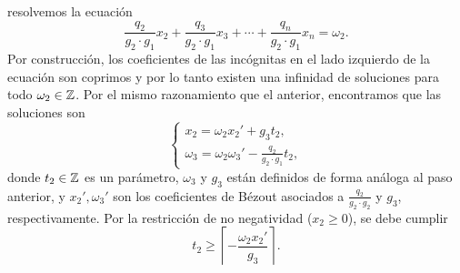 resolvemos la ecuación
\begin{equation*}
	\frac{q_2}{g_2 \cdot g_1}x_2 +
	\frac{q_3}{g_2 \cdot g_1}x_3 +
	\cdots +
	\frac{q_n}{g_2 \cdot g_1}x_n
	= \omega_2.
\end{equation*}
Por construcción, los coeficientes de las incógnitas en el lado izquierdo de la ecuación son
coprimos y por lo tanto existen una infinidad de soluciones para todo $\omega_2 \in \mathbb{Z}$. Por el
mismo razonamiento que el anterior, encontramos que las soluciones son
\begin{equation*}
	\begin{cases}
		x_2 = \omega_2x_2' + g_3t_2, \\
		\omega_3 = \omega_2\omega_3' - \frac{q_2}{g_2 \cdot g_1}t_2,
	\end{cases}
\end{equation*}
donde $t_2 \in \mathbb{Z}$ es un parámetro, $\omega_3$ y $g_3$ están definidos de forma análoga al paso
anterior, y $x_2', \omega_3'$ son los coeficientes de Bézout asociados a $\frac{q_2}{g_2 \cdot g_2}$
y $g_3$, respectivamente. Por la restricción de no negatividad ($x_2 \geq 0$), se debe cumplir
\begin{equation*}
	t_2 \geq \left\lceil -\frac{\omega_2x_2'}{g_3} \right\rceil.
\end{equation*}

